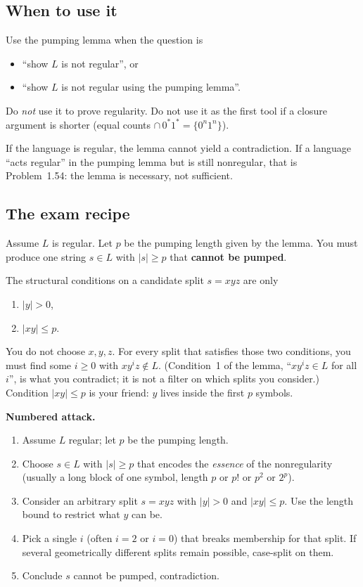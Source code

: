 \documentclass[11pt,a4paper]{article}
\begin{document}
\subsection{When to use it}

Use the pumping lemma when the question is
\begin{itemize}[nosep]
  \item ``show $L$ is not regular'', or
  \item ``show $L$ is not regular using the pumping lemma''.
\end{itemize}
Do \emph{not} use it to prove regularity. Do not use it as the first
tool if a closure argument is shorter (equal counts
$\cap\,0^*1^*=\{0^n1^n\}$).

If the language is regular, the lemma cannot yield a contradiction.
If a language ``acts regular'' in the pumping lemma but is still
nonregular, that is Problem~1.54: the lemma is necessary, not
sufficient.

\subsection{The exam recipe}

Assume $L$ is regular. Let $p$ be the pumping length given by the
lemma. You must produce one string $s\in L$ with $|s|\ge p$ that
\textbf{cannot be pumped}.

The structural conditions on a candidate split $s=xyz$ are only
\begin{enumerate}[nosep]
  \item $|y|>0$,
  \item $|xy|\le p$.
\end{enumerate}
You do not choose $x,y,z$. For every split that satisfies those two
conditions, you must find some $i\ge 0$ with $xy^iz\notin L$.
(Condition~1 of the lemma, ``$xy^iz\in L$ for all $i$'', is what
you contradict; it is not a filter on which splits you consider.)
Condition $|xy|\le p$ is your friend: $y$ lives inside the first
$p$ symbols.

\textbf{Numbered attack.}
\begin{enumerate}
  \item Assume $L$ regular; let $p$ be the pumping length.
  \item Choose $s\in L$ with $|s|\ge p$ that encodes the
        \emph{essence} of the nonregularity (usually a long block of
        one symbol, length $p$ or $p!$ or $p^2$ or $2^p$).
  \item Consider an arbitrary split $s=xyz$ with $|y|>0$ and
        $|xy|\le p$. Use the length bound to restrict what $y$
        can be.
  \item Pick a single $i$ (often $i=2$ or $i=0$) that breaks
        membership for that split. If several geometrically different
        splits remain possible, case-split on them.
  \item Conclude $s$ cannot be pumped, contradiction.
\end{enumerate}
\end{document}
